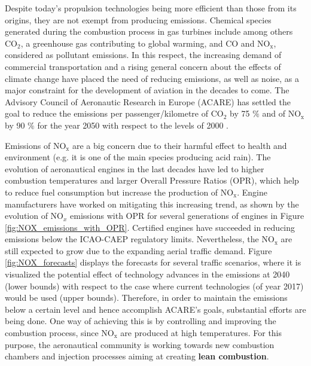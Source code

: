 
Despite today's propulsion technologies being more efficient than those from its origins, they are not exempt from producing emissions. Chemical species generated during the combustion process in gas turbines include among others CO$_2$, a greenhouse gas contributing to global warming, and CO and NO$_\mathrm{x}$, considered as pollutant emissions. In this respect, the increasing demand of commercial transportation and a rising general concern about the effects of climate change have placed the need of reducing emissions, as well as noise, as a major constraint for the development of aviation in the decades to come. The Advisory Council of Aeronautic Research in Europe (ACARE) has settled the goal to reduce the emissions per passenger/kilometre of CO$_2$ by 75 $\%$ and of NO$_\mathrm{x}$ by 90 $\%$ for the year 2050 with respect to the levels of 2000 .

Emissions of NO$_\mathrm{x}$ are a big concern due to their harmful effect to health and environment (e.g. it is one of the main species producing acid rain). The evolution of aeronautical engines in the last decades have led to higher combustion temperatures and larger Overall Pressure Ratios (OPR), which help to reduce fuel consumption but increase the production of NO$_\mathrm{x}$. Engine manufacturers have worked on mitigating this increasing trend, as shown by the evolution of NO$_x$ emissions with OPR for several generations of engines in Figure \ref{fig:NOX_emissions_with_OPR}. Certified engines have succeeded in reducing emissions below the ICAO-CAEP regulatory limits. Nevertheless, the NO$_\mathrm{x}$ are still expected to grow due to the expanding aerial traffic demand. Figure \ref{fig:NOX_forecasts} displays the forecasts for several traffic scenarios, where it is visualized the potential effect of technology advances in the emissions at 2040 (lower bounds) with respect to the case where current technologies (of year 2017) would be used (upper bounds). Therefore, in order to maintain the emissions below a certain level and hence accomplish ACARE's goals, substantial efforts are being done. One way of achieving this is by controlling and improving the combustion process, since NO$_\mathrm{x}$ are produced at high temperatures. For this purpose, the aeronautical community is working towards new combustion chambers and injection processes aiming at creating \textbf{lean combustion}.


